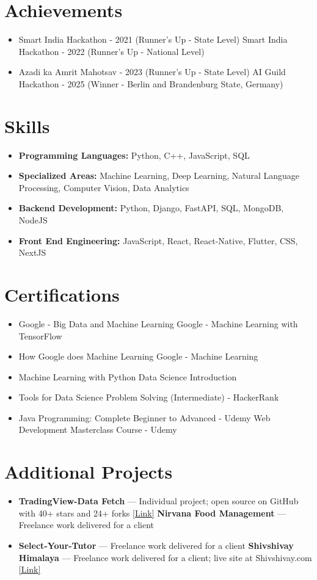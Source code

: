 \documentclass[a4paper,10pt]{article}
\begin{document}
\section*{Achievements}
\begin{itemize}
\item Smart India Hackathon - 2021 (Runner's Up - State Level) \hfill Smart India Hackathon - 2022 (Runner's Up - National Level)
\item Azadi ka Amrit Mahotsav - 2023 (Runner's Up - State Level) \hfill AI Guild Hackathon - 2025 (Winner - Berlin and Brandenburg State, Germany)
\end{itemize}

\section*{Skills}
\begin{itemize}
  \item \textbf{Programming Languages:} Python, C++, JavaScript, SQL
  \item \textbf{Specialized Areas:} Machine Learning, Deep Learning, Natural Language Processing, Computer Vision, Data Analytics
  \item \textbf{Backend Development:} Python, Django, FastAPI, SQL, MongoDB, NodeJS
  \item \textbf{Front End Engineering:} JavaScript, React, React-Native, Flutter, CSS, NextJS
\end{itemize}

\section*{Certifications}
\begin{itemize}
\item Google - Big Data and Machine Learning \hfill Google - Machine Learning with TensorFlow
\item How Google does Machine Learning \hfill Google - Machine Learning
\item Machine Learning with Python \hfill Data Science Introduction
\item Tools for Data Science \hfill Problem Solving (Intermediate) - HackerRank
\item Java Programming: Complete Beginner to Advanced - Udemy \hfill Web Development Masterclass Course - Udemy
\end{itemize}

\section*{Additional Projects}
\begin{itemize}
\item \textbf{TradingView-Data Fetch} — Individual project; open source on GitHub with 40+ stars and 24+ forks \href{https://github.com/ravalmeet/TradingView}{[Link]} \hfill \textbf{Nirvana Food Management} — Freelance work delivered for a client
\item \textbf{Select-Your-Tutor} — Freelance work delivered for a client \hfill \textbf{Shivshivay Himalaya} — Freelance work delivered for a client; live site at Shivshivay.com \href{Shivshivay.com}{[Link]}
\end{itemize}
\end{document}
